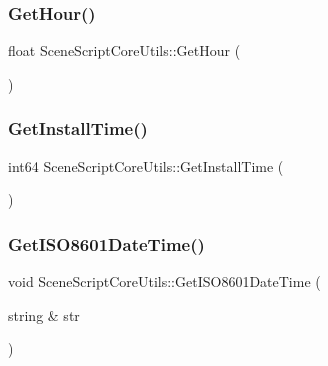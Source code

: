 \hypertarget{class_scene_script_core_utils_a9c899b92c5c7c6132730b7c98011067e}{}\label{class_scene_script_core_utils_a9c899b92c5c7c6132730b7c98011067e} 
\subsubsection{\texorpdfstring{Get\+Hour()}{GetHour()}}
{\footnotesize\ttfamily float Scene\+Script\+Core\+Utils\+::\+Get\+Hour (\begin{DoxyParamCaption}{ }\end{DoxyParamCaption})}

\hypertarget{class_scene_script_core_utils_a5fd4bda31c2e16a9d62564a5e471e7bc}{}\label{class_scene_script_core_utils_a5fd4bda31c2e16a9d62564a5e471e7bc} 
\subsubsection{\texorpdfstring{Get\+Install\+Time()}{GetInstallTime()}}
{\footnotesize\ttfamily int64 Scene\+Script\+Core\+Utils\+::\+Get\+Install\+Time (\begin{DoxyParamCaption}{ }\end{DoxyParamCaption})}

\hypertarget{class_scene_script_core_utils_a82c988bc35f1a57634f324190edcd8b2}{}\label{class_scene_script_core_utils_a82c988bc35f1a57634f324190edcd8b2} 
\subsubsection{\texorpdfstring{Get\+I\+S\+O8601\+Date\+Time()}{GetISO8601DateTime()}}
{\footnotesize\ttfamily void Scene\+Script\+Core\+Utils\+::\+Get\+I\+S\+O8601\+Date\+Time (\begin{DoxyParamCaption}\item[{string \&}]{str }\end{DoxyParamCaption})}

